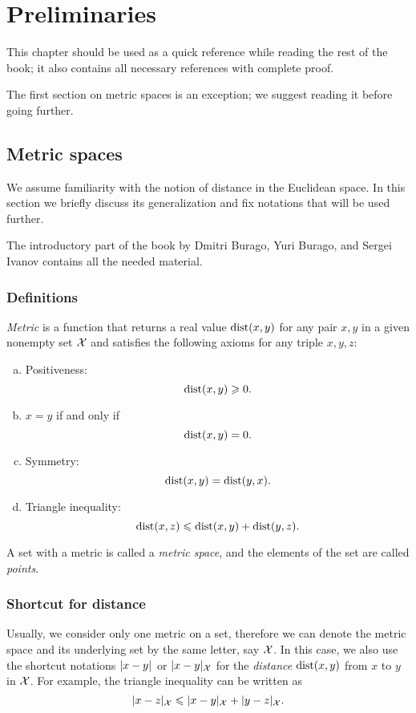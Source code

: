 \addtocounter{chapter}{-1}
\chapter{Preliminaries}

This chapter should be used as a quick reference while reading the rest of the book;
it also contains all necessary references with complete proof.

The first section on metric spaces is an exception;
we suggest reading it before going further.

\section{Metric spaces}\label{sec:metric-spcaes}

We assume familiarity with the notion of distance in the 
Euclidean space.
In this section we briefly discuss its generalization and fix notations that will be used further.

The introductory part of the book by Dmitri Burago, Yuri Burago, and Sergei Ivanov \cite{burago-burago-ivanov} contains all the needed material.

\subsection*{Definitions}

\emph{Metric} is a function that returns a real value $\mathop{\rm dist}\nolimits(x,y)$ for any pair $x,y$ in a given nonempty set $\mathcal{X}$  and satisfies the following axioms for any triple $x,y,z$: \label{page:def:metric}
\begin{enumerate}[(a)]
\item\label{def:metric-space:a} Positiveness: 
$$\mathop{\rm dist}\nolimits(x,y)\geqslant 0.$$
\item\label{def:metric-space:b} $x=y$ if and only if 
$$\mathop{\rm dist}\nolimits(x,y)=0.$$
\item\label{def:metric-space:c} Symmetry: $$\mathop{\rm dist}\nolimits(x, y) = \mathop{\rm dist}\nolimits(y, x).$$
\item\label{def:metric-space:d} Triangle inequality: 
$$\mathop{\rm dist}\nolimits(x, z) \leqslant \mathop{\rm dist}\nolimits(x, y) + \mathop{\rm dist}\nolimits(y, z).$$
\end{enumerate}

A set with a metric is called a \emph{metric space}, and the elements of the set are called \emph{points}.

\subsection*{Shortcut for distance}
Usually, we consider only one metric on a set, therefore we can denote the metric space and its underlying set by the same letter, say $\mathcal{X}$.
In this case, we also use the shortcut notations $\dist{x}{y}{}$ or $\dist{x}{y}{\spc{X}}$  for the {}\emph{distance} $\mathop{\rm dist}\nolimits(x,y)$ from $x$ to $y$ in $\mathcal{X}$.
For example, the triangle inequality can be written as 
$$\dist{x}{z}{\spc{X}}\le \dist{x}{y}{\spc{X}}+\dist{y}{z}{\spc{X}}.$$

